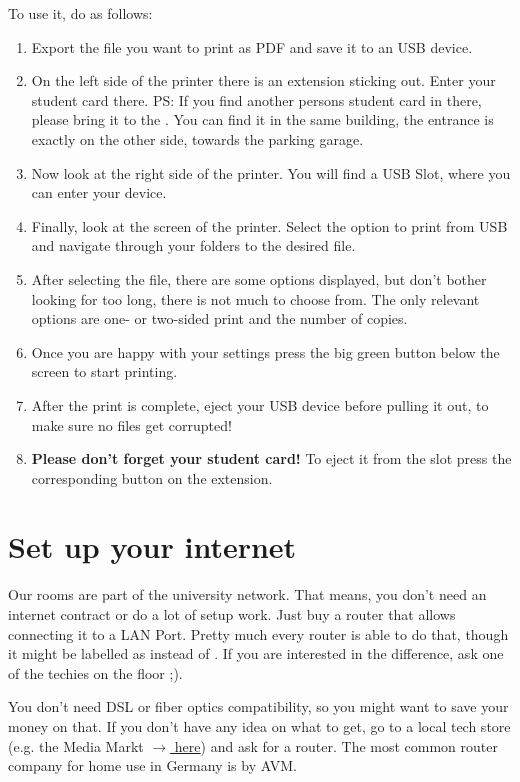To use it, do as follows:
\begin{enumerate}
    \item Export the file you want to print as PDF and save it to an USB device.
    \item On the left side of the printer there is an extension sticking out. Enter your student card there. PS: If you find another persons student card in there, please bring it to the . You can find it in the same building, the entrance is exactly on the other side, towards the parking garage.
    \item Now look at the right side of the printer. You will find a USB Slot, where you can enter your device.
    \item Finally, look at the screen of the printer. Select the option to print from USB and navigate through your folders to the desired file.
    \item After selecting the file, there are some options displayed, but don't bother looking for too long, there is not much to choose from. The only relevant options are one- or two-sided print and the number of copies.
    \item Once you are happy with your settings press the big green button below the screen to start printing.
    \item After the print is complete, eject your USB device before pulling it out, to make sure no files get corrupted!
    \item \textbf{Please don't forget your student card!} To eject it from the slot press the corresponding button on the extension.
\end{enumerate}

\section{Set up your internet}
Our rooms are part of the university network. That means, you don't need an internet contract or do a lot of setup work. Just buy a router that allows connecting it to a LAN Port. Pretty much every router is able to do that, though it might be labelled as  instead of . If you are interested in the difference, ask one of the techies on the floor ;). 

You don't need DSL or fiber optics compatibility, so you might want to save your money on that. If you don't have any idea on what to get, go to a local tech store (e.g. the Media Markt \href{https://maps.app.goo.gl/XmRXQEo6ihkXH9jS9}{$\xrightarrow{}$ here}) and ask for a router. The most common router company for home use in Germany is  by AVM.

